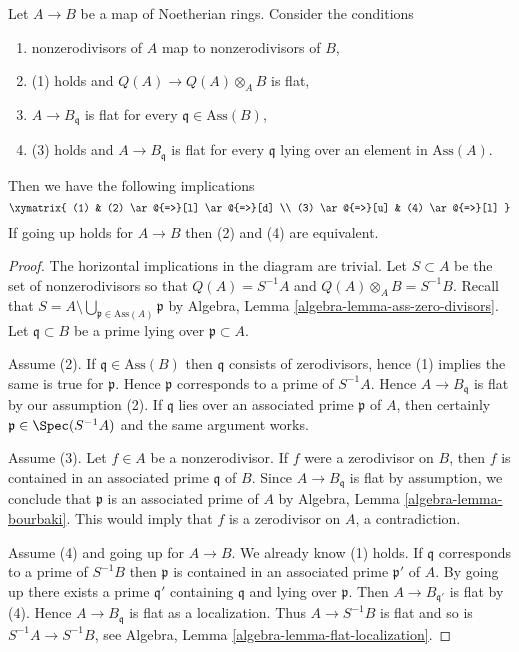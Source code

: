 \begin{lemma}
\label{lemma-explain-condition}
Let $A \to B$ be a map of Noetherian rings. Consider the conditions
\begin{enumerate}
\item nonzerodivisors of $A$ map to nonzerodivisors of $B$,
\item (1) holds and $Q(A) \to Q(A) \otimes_A B$ is flat,
\item $A \to B_\mathfrak q$ is flat for every
$\mathfrak q \in \text{Ass}(B)$,
\item (3) holds and $A \to B_\mathfrak q$ is flat for every $\mathfrak q$
lying over an element in $\text{Ass}(A)$.
\end{enumerate}
Then we have the following implications
$$
\xymatrix{
(1) & (2) \ar@{=>}[l] \ar@{=>}[d] \\
(3) \ar@{=>}[u] & (4) \ar@{=>}[l]
}
$$
If going up holds for $A \to B$ then (2) and (4) are equivalent.
\end{lemma}

\begin{proof}
The horizontal implications in the diagram are trivial.
Let $S \subset A$ be the set of nonzerodivisors so that
$Q(A) = S^{-1}A$ and $Q(A) \otimes_A B = S^{-1}B$. Recall that
$S = A \setminus \bigcup_{\mathfrak p \in \text{Ass}(A)} \mathfrak p$
by Algebra, Lemma \ref{algebra-lemma-ass-zero-divisors}.
Let $\mathfrak q \subset B$ be a prime lying over $\mathfrak p \subset A$.

\medskip\noindent
Assume (2). If $\mathfrak q \in \text{Ass}(B)$ then
$\mathfrak q$ consists of zerodivisors, hence (1) implies
the same is true for $\mathfrak p$. Hence
$\mathfrak p$ corresponds to a prime of $S^{-1}A$.
Hence $A \to B_\mathfrak q$ is flat by our assumption (2).
If $\mathfrak q$ lies over an associated prime $\mathfrak p$
of $A$, then certainly $\mathfrak p \in \Spec(S^{-1}A)$ and the
same argument works.

\medskip\noindent
Assume (3). Let $f \in A$ be a nonzerodivisor. If $f$ were a zerodivisor
on $B$, then $f$ is contained in an associated prime $\mathfrak q$
of $B$. Since $A \to B_\mathfrak q$ is flat by assumption, we conclude that
$\mathfrak p$ is an associated prime of $A$ by
Algebra, Lemma \ref{algebra-lemma-bourbaki}. This would imply that
$f$ is a zerodivisor on $A$, a contradiction.

\medskip\noindent
Assume (4) and going up for $A \to B$. We already know (1) holds.
If $\mathfrak q$ corresponds to a prime of $S^{-1}B$ then $\mathfrak p$
is contained in an associated prime $\mathfrak p'$ of $A$. By going up
there exists a prime $\mathfrak q'$ containing $\mathfrak q$ and lying
over $\mathfrak p$. Then $A \to B_{\mathfrak q'}$ is flat by
(4). Hence $A \to B_{\mathfrak q}$ is flat as a localization.
Thus $A \to S^{-1}B$ is flat and so is $S^{-1}A \to S^{-1}B$, see
Algebra, Lemma \ref{algebra-lemma-flat-localization}.
\end{proof}

